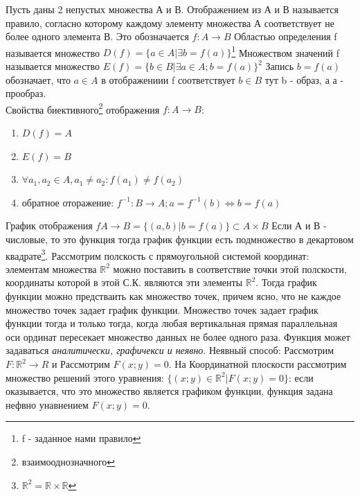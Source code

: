 \documentclass[oneside]{book}
\begin{document}
\begin{enumerate}
Пусть даны 2 непустых множества А и В. Отображением из А и В называется правило, согласно которому каждому элементу
множества А соответствует не более одного элемента В. Это обозначается $f : A \rightarrow B$
Областью определения f называется множество $D(f) = \{a \in A | \exists b = f(a)\}$\footnote{f - заданное нами правило}
Множеством значений f называется множество $E(f) = \{b \in B | \exists a \in A; b = f(a)\}^2$ Запись
$b = f(a)$ обозначает, что $a \in A$ в отображениии f соответствует $b \in B$ тут b - образ, а а - прообраз. \\
Свойства биективного\footnote{взаимооднозначного} отображения $f: A \rightarrow B$:
\begin{enumerate}
    \item $D(f) = A$
    \item $E(f) = B$
    \item $\forall a_1, a_2 \in A, a_1 \neq a_2: f(a_1) \neq f(a_2)$
    \item обратное оторажение: $f^{-1}: B \rightarrow A; a = f^{-1}(b) \Leftrightarrow b = f(a)$
\end{enumerate}
График отображения $f A \rightarrow B = \{(a, b) | b = f(a)\} \subset A \times B$ Если А и В - числовые, то это функция тогда
график функции есть подмножество в декартовом квадрате\footnote{$\mathbb{R}^2 = \mathbb{R} \times \mathbb{R}$}.
Рассмотрим полскость с прямоугольной системой координат: элементам множества $\mathbb{R}^2$ можно поставить в соответствие
точки этой полскости, координаты которой в этой С.К. являются  эти элементы $\mathbb{R}^2$. Тогда график функции можно предстваить как
множество точек, причем ясно, что не каждое множество точек задает график функции. Множество точек задает график функции тогда и только
тогда, когда любая вертикальная прямая параллельная оси ординат пересекает множество данных не более одного раза. Функция может задаваться
\textit{аналитически, графичекси и неявно}. Неявный способ: Рассмотрим $F : \mathbb{R}^2 \rightarrow R$ и Рассмотрим $F(x;y) = 0$.
На Координатной плоскости рассмотрим множество решений этого уравнения: $\{(x;y) \in \mathbb{R}^2 | F(x;y) = 0\}$: если оказывается, что
это множество является графиком функции, функция задана нефвно унавнением $F(x;y) = 0$.


\end{enumerate}
\end{document}

